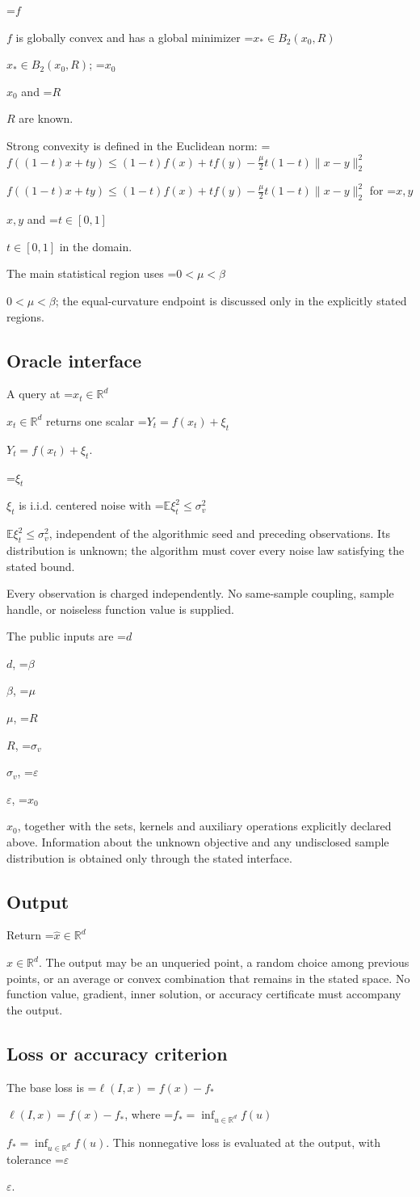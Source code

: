 \documentclass[10pt,a4paper]{article}
\newcommand{\AtlasMath}[1]{\par\begingroup\centering\setbox0=\hbox{$\displaystyle #1$}\ifdim\wd0>1.4\linewidth\typeout{ATLAS WIDE FORMULA: \the\wd0}\fi\ifdim\wd0>\linewidth\resizebox{\linewidth}{!}{\box0}\else\box0\fi\par\endgroup}
\newcommand{\AtlasInlineMath}[1]{\begingroup\setbox0=\hbox{$#1$}\ifdim\wd0>.4\linewidth\endgroup\AtlasMath{#1}\else\endgroup$#1$\fi}
\begin{document}
\AtlasInlineMath{f} is globally convex and has a global minimizer \AtlasInlineMath{x_*\in B_2(x_0,R)}; \AtlasInlineMath{x_0} and \AtlasInlineMath{R} are known.

Strong convexity is defined in the Euclidean norm: \AtlasInlineMath{f((1-t)x+ty)\le(1-t)f(x)+tf(y)-\frac{\mu}{2}t(1-t)\|x-y\|_2^2} for \AtlasInlineMath{x,y} and \AtlasInlineMath{t\in[0,1]} in the domain.

The main statistical region uses \AtlasInlineMath{0<\mu<\beta}; the equal-curvature endpoint is discussed only in the explicitly stated regions.

\subsection{Oracle interface}
A query at \AtlasInlineMath{x_t\in \mathbb{R}^d} returns one scalar \AtlasInlineMath{Y_t=f(x_t)+\xi_t}.

\AtlasInlineMath{\xi_t} is i.i.d. centered noise with \AtlasInlineMath{\mathbb{E}\xi_t^2\le\sigma_v^2}, independent of the algorithmic seed and preceding observations. Its distribution is unknown; the algorithm must cover every noise law satisfying the stated bound.

Every observation is charged independently. No same-sample coupling, sample handle, or noiseless function value is supplied.

The public inputs are \AtlasInlineMath{d}, \AtlasInlineMath{\beta}, \AtlasInlineMath{\mu}, \AtlasInlineMath{R}, \AtlasInlineMath{\sigma_v}, \AtlasInlineMath{\varepsilon}, \AtlasInlineMath{x_0}, together with the sets, kernels and auxiliary operations explicitly declared above. Information about the unknown objective and any undisclosed sample distribution is obtained only through the stated interface.

\subsection{Output}
Return \AtlasInlineMath{\widehat{x}\in \mathbb{R}^d}. The output may be an unqueried point, a random choice among previous points, or an average or convex combination that remains in the stated space. No function value, gradient, inner solution, or accuracy certificate must accompany the output.

\subsection{Loss or accuracy criterion}
The base loss is \AtlasInlineMath{\ell(I,x)=f(x)-f_*}, where \AtlasInlineMath{f_*=\inf_{u\in \mathbb{R}^d}f(u)}. This nonnegative loss is evaluated at the output, with tolerance \AtlasInlineMath{\varepsilon}.
\end{document}
